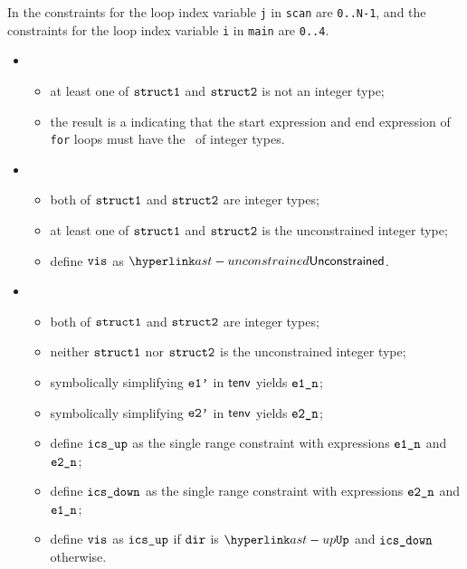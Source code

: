 In  the constraints for the loop index variable
\verb|j| in \verb|scan| are \verb|0..N-1|,
and the constraints for the loop index variable \verb|i| in \verb|main| are \verb|0..4|.

\ProseParagraph
\OneApplies
\begin{itemize}
  \item {}
  \begin{itemize}
    \item at least one of $\texttt{struct1}$ and $\texttt{struct2}$ is not an integer type;
    \item the result is a \typingerrorterm{} indicating that the start expression and end expression of \texttt{for} loops
          must have the \structure\ of integer types.
  \end{itemize}

  \item {}
  \begin{itemize}
    \item both of $\texttt{struct1}$ and $\texttt{struct2}$ are integer types;
    \item at least one of $\texttt{struct1}$ and $\texttt{struct2}$ is the unconstrained integer type;
    \item define $\texttt{vis}$ as $\unconstrained$.
  \end{itemize}

  \item {}
  \begin{itemize}
    \item both of $\texttt{struct1}$ and $\texttt{struct2}$ are integer types;
    \item neither $\texttt{struct1}$ nor $\texttt{struct2}$ is the unconstrained integer type;
    \item symbolically simplifying $\texttt{e1'}$ in $\textsf{tenv}$ yields $\texttt{e1\_n}$\ProseOrTypeError;
    \item symbolically simplifying $\texttt{e2'}$ in $\textsf{tenv}$ yields $\texttt{e2\_n}$\ProseOrTypeError;
    \item define $\texttt{ics\_up}$ as the single range constraint with expressions $\texttt{e1\_n}$ and $\texttt{e2\_n}$;
    \item define $\texttt{ics\_down}$ as the single range constraint with expressions $\texttt{e2\_n}$ and $\texttt{e1\_n}$;
    \item define $\texttt{vis}$ as $\texttt{ics\_up}$ if $\texttt{dir}$ is $\UP$ and $\texttt{ics\_down}$ otherwise.
  \end{itemize}
\end{itemize}

